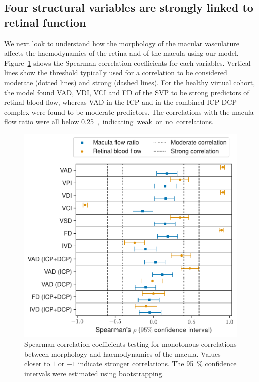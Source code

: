 \documentclass[11pt,]{article}
\begin{document}
\subsection{Four structural variables are strongly linked to retinal function}\label{sec:StructureAndFunction}

We next look to understand how the morphology of the macular vasculature affects the haemodynamics of the retina and of the macula using our model.
Figure~\ref{fig:SpearmanCorrelations} shows the Spearman correlation coefficients for each variables.
Vertical lines show the threshold typically used for a correlation to be considered moderate (dotted lines) and strong (dashed lines).
For the healthy virtual cohort, the model found VAD, VDI, VCI and FD of the SVP to be strong predictors of retinal blood flow, whereas VAD in the ICP and in the combined ICP-DCP complex were found to be moderate predictors.
The correlations with the macula flow ratio were all below \SI{0.25}, indicating weak or no correlations.

\begin{figure}[ht!]
  \centering
  \includegraphics[width=.95\textwidth]{SpearmanCoefficients}
  \caption{\label{fig:SpearmanCorrelations}Spearman correlation coefficients testing for monotonous correlations between morphology and haemodynamics of the macula. Values closer to $1$ or $-1$ indicate stronger correlations. The \SI{95}{\percent} confidence intervals were estimated using bootstrapping.}
\end{figure}
\end{document}
